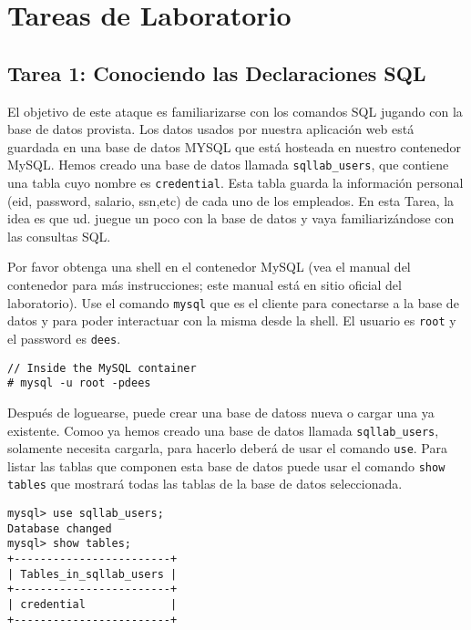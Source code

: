 \section{Tareas de Laboratorio}



\subsection{Tarea 1: Conociendo las Declaraciones SQL}
\label{ssec:MySQLConsole}

El objetivo de este ataque es familiarizarse con los comandos SQL jugando con la base de datos provista. Los datos usados por nuestra aplicación web está guardada en una base de datos MYSQL que está hosteada en nuestro contenedor MySQL.
Hemos creado una base de datos llamada \texttt{sqllab\_users}, que contiene una tabla cuyo nombre es {\tt credential}. Esta tabla guarda la información personal (eid, password, salario, ssn,etc) de cada uno de los empleados. En esta Tarea, la idea es que ud. juegue un poco con la base de datos y vaya familiarizándose con las consultas SQL.

Por favor obtenga una shell en el contenedor MySQL (vea el manual del contenedor para más instrucciones; este manual está en sitio oficial del laboratorio).
Use el comando \texttt{mysql} que es el cliente para conectarse a la base de datos y para poder interactuar con la misma desde la shell.
El usuario es {\tt root} y el password es {\tt dees}. 

	
\begin{lstlisting}
// Inside the MySQL container
# mysql -u root -pdees 
\end{lstlisting}

Después de loguearse, puede crear una base de datoss nueva o cargar una ya existente. Comoo ya hemos creado una base de datos llamada \texttt{sqllab\_users}, solamente necesita cargarla, para hacerlo deberá de usar el comando \texttt{use}.
Para listar las tablas que componen esta base de datos puede usar el comando  \texttt{show tables} que mostrará todas las tablas de la base de datos seleccionada.

\begin{lstlisting}
mysql> use sqllab_users;
Database changed
mysql> show tables;
+------------------------+
| Tables_in_sqllab_users |
+------------------------+
| credential             |
+------------------------+
\end{lstlisting}

